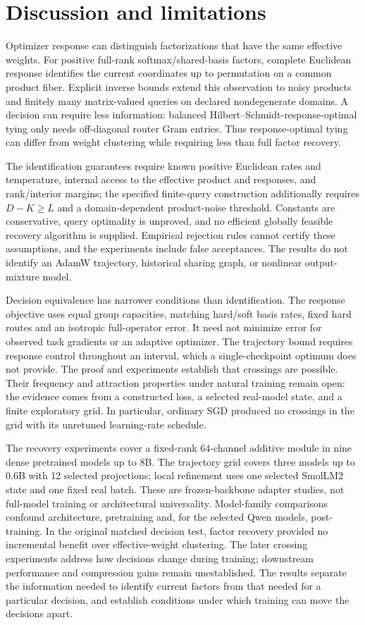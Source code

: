 \section{Discussion and limitations}

Optimizer response can distinguish factorizations that have the same
effective weights.
For positive full-rank softmax/shared-basis factors, complete Euclidean
response identifies the current coordinates up to permutation on a common
product fiber. Explicit inverse bounds extend this observation to noisy
products and finitely many matrix-valued queries on declared nondegenerate
domains. A decision can require less information: balanced
Hilbert--Schmidt-response-optimal tying only needs off-diagonal router Gram
entries. Thus response-optimal tying can differ from weight clustering while
requiring less than full factor recovery.

The identification guarantees require known positive Euclidean rates and
temperature, internal access to the effective product and responses, and
rank/interior margins; the specified finite-query construction additionally
requires $D-K\ge L$ and a domain-dependent product-noise threshold.
Constants are conservative, query optimality is unproved, and no efficient
globally feasible recovery algorithm is supplied. Empirical rejection rules cannot certify these assumptions, and the
experiments include false acceptances. The results do not identify an AdamW trajectory, historical
sharing graph, or nonlinear output-mixture model.

Decision equivalence has narrower conditions than identification. The
response objective uses equal group capacities, matching hard/soft basis
rates, fixed hard routes and an isotropic full-operator error. It need not
minimize error for observed task gradients or an adaptive optimizer.
The trajectory bound requires response control throughout an interval,
which a single-checkpoint optimum does not provide. The proof and experiments establish that crossings are possible. Their
frequency and attraction properties under natural training remain open:
the evidence comes from a constructed loss, a selected real-model state,
and a finite exploratory grid. In particular, ordinary SGD produced no
crossings in the grid with its unretuned learning-rate schedule.

The recovery experiments cover a fixed-rank 64-channel additive module in
nine dense pretrained models up to 8B. The trajectory grid covers three
models up to 0.6B with 12 selected projections; local refinement uses one
selected SmolLM2 state and one fixed real batch. These are frozen-backbone
adapter studies, not full-model training or architectural universality.
Model-family comparisons confound architecture, pretraining and, for the
selected Qwen models, post-training. In the original matched decision test, factor recovery provided no
incremental benefit over effective-weight clustering. The later crossing
experiments address how decisions change during training; downstream
performance and compression gains remain unestablished. The results separate
the information needed to identify current factors from that needed for a
particular decision, and establish conditions under which training can move
the decisions apart.
